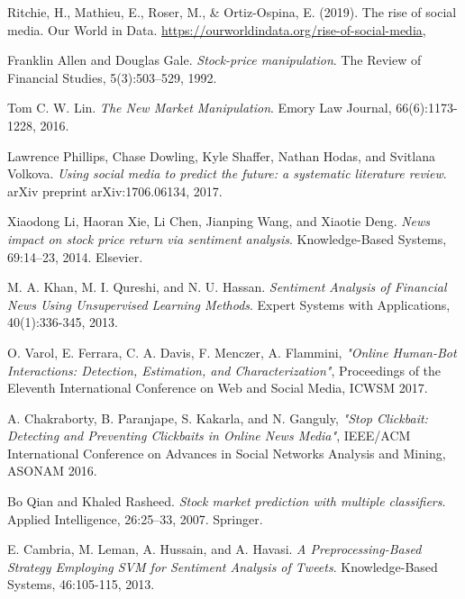 \documentclass[12pt, a4paper,twoside]{report}
\theoremstyle{plain} %
\theoremstyle{definition} %
\theoremstyle{remark} %
\numberwithin{equation}{chapter}
\begin{document}
\begin{thebibliography}{999}



Ritchie, H., Mathieu, E., Roser, M., \& Ortiz-Ospina, E. (2019).
\newblock The rise of social media.
\newblock Our World in Data.
\url{https://ourworldindata.org/rise-of-social-media},

Franklin Allen and Douglas Gale.
\textit{Stock-price manipulation}.
The Review of Financial Studies, 5(3):503--529, 1992.

Tom C. W. Lin.
\textit{The New Market Manipulation}.
Emory Law Journal, 66(6):1173-1228, 2016.

Lawrence Phillips, Chase Dowling, Kyle Shaffer, Nathan Hodas, and Svitlana Volkova.
\textit{Using social media to predict the future: a systematic literature review}.
arXiv preprint arXiv:1706.06134, 2017.

Xiaodong Li, Haoran Xie, Li Chen, Jianping Wang, and Xiaotie Deng.
\textit{News impact on stock price return via sentiment analysis}.
Knowledge-Based Systems, 69:14--23, 2014.
Elsevier.

M. A. Khan, M. I. Qureshi, and N. U. Hassan.
\textit{Sentiment Analysis of Financial News Using Unsupervised Learning Methods}.
Expert Systems with Applications, 40(1):336-345, 2013.

O. Varol, E. Ferrara, C. A. Davis, F. Menczer, A. Flammini,
\textit{"Online Human-Bot Interactions: Detection, Estimation, and Characterization"},
Proceedings of the Eleventh International Conference on Web and Social Media, ICWSM 2017.

A. Chakraborty, B. Paranjape, S. Kakarla, and N. Ganguly,
\textit{"Stop Clickbait: Detecting and Preventing Clickbaits in Online News Media"},
IEEE/ACM International Conference on Advances in Social Networks Analysis and Mining, ASONAM 2016.

Bo Qian and Khaled Rasheed.
\textit{Stock market prediction with multiple classifiers}.
Applied Intelligence, 26:25–33, 2007.
Springer.



E. Cambria, M. Leman, A. Hussain, and A. Havasi.
\textit{A Preprocessing-Based Strategy Employing SVM for Sentiment Analysis of Tweets}.
Knowledge-Based Systems, 46:105-115, 2013.


\end{thebibliography}
\end{document}
